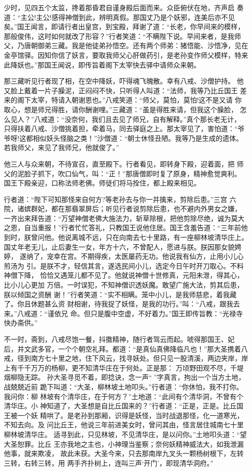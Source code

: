 少时，见四五个太监，搀着那昏君自谨身殿后面而来。众臣俯伏在地，齐声启
奏道：“主公!主公!感得神僧到此，辨明真假。那国丈乃是个妖邪，连美后亦不见
矣。”国王闻言，即请行者出皇宫，到宝殿，拜谢了道：“长老，你早间来的模样，
那般俊伟，这时如何就改了形容？”行者笑道：“不瞒陛下说。早间来者，是我师
父，乃唐朝御弟三藏。我是他徒弟孙悟空。还有两个师弟：猪悟能、沙悟净，见在
金亭馆驿。因知你信了妖言，要取我师父心肝做药引，是老孙变作师父模样，特来
此降妖也。”那国王闻说，即传旨着阁下太宰快去驿中请师众来朝。

那三藏听见行者现了相，在空中降妖，吓得魂飞魄散。幸有八戒、沙僧护持。
他又脸上戴着一片子臊泥，正闷闷不快，只听得人叫道：“法师，我等乃比丘国王
差来的阁下太宰，特请入朝谢恩也。”八戒笑道：“师父，莫怕，莫怕!这不是又请
你取心，想是师兄得胜，请你酬谢哩。”三藏道：“虽是得胜来请，但我这个臊脸，
怎么见人？”八戒道：“没奈何，我们且去见了师兄，自有解释。”真个那长老无计，
只得扶着八戒、沙僧挑着担，牵着马，同去驿庭之上。那太宰见了，害怕道：“爷
爷呀!这都相似妖头怪脑之类！”沙僧道：“朝士休怪丑陋。我等乃是生成的遗体。
若我师父，来见了我师兄，他就俊了。”

他三人与众来朝，不待宣召，直至殿下。行者看见，即转身下殿，迎着面，把
师父的泥脸子抓下，吹口仙气，叫：“正！”那唐僧即时复了原身，精神愈觉爽利。
国王下殿亲迎，口称法师老佛。师徒们将马拴住，都上殿来相见。

行者道：“陛下可知那怪来自何方?等老孙去与你一并擒来，剪除后患。”三宫
六院，诸嫔群妃，都在那翡翠屏后；听见行者说剪除后患，也不避内外男女之嫌，
一齐出来拜告道：“万望神僧老佛大施法力，斩草除根，把他剪除尽绝，诚为莫大
之恩，自当重报！”行者忙忙答礼，只教国王说他住居。国王含羞告道：“三年前他
到时，朕曾问他。他说离城不远，只在向南去七十里路，有一座柳林坡清华庄上。
国丈年老无儿，止后妻生一女，年方十六，不曾配人，愿进与朕。朕因那女貌娉婷，
遂纳了，宠幸在宫。不期得疾，太医屡药无功。他说我有仙方，止用小儿心煎汤为
引。是朕不才，轻信其言，遂选民间小儿，选定今日午时开刀取心。不料神僧下降，
恰恰又遇笼儿都不见了。他就说神僧十世修真，元阳未泄，得其心，比小儿心更加
万倍。一时误犯，不知神僧识透妖魔。敢望广施大法，剪其后患，朕以倾国之资酬
谢！”行者笑道：“实不相瞒。笼中小儿，是我师慈悲，着我藏了。你且休题甚么资
财相谢，待我捉了妖怪，是我的功行。”叫：“八戒，跟我去来。”八戒道：“谨依兄
命。但只是腹中空虚，不好着力。”国王即传旨教：“光禄寺快办斋供。”

不一时，斋到，八戒尽饱一餐，抖擞精神，随行者驾云而起。唬得那国王、妃
后，并文武多官，一个个朝空礼拜。都道：“是真仙真佛降临凡也！”那大圣携着八
戒，径到南方七十里之地，住下风云，找寻妖处。但只见一股清溪，两边夹岸，岸
上有千千万万的杨柳，更不知清华庄在于何处。正是那：
万顷野田观不尽，千堤烟柳隐无踪。
孙大圣寻觅不着，即捻诀，念一声“”字真言，拘出一个当方土地，战兢兢近前
跪下叫道：“大圣，柳林坡土地叩头。”行者道：“你休怕，我不打你。我问你：柳
林坡有个清华庄，在于何方？”土地道：“此间有个清华洞，不曾有个清华庄。小
神知道了，大圣想是自比丘国来的？”行者道：“正是，正是。比丘国王被一个妖
精哄了。是老孙到那厢，识得是妖怪，当时战退那怪，化一道寒光，不知去向。及
问比丘王，他说三年前进美女时，曾问其由，怪言居住城南七十里柳林坡清华庄。
适寻到此，只见林坡，不见清华庄，是以问你。”土地叩头道：“望大圣恕罪。比丘
王亦我地之主也，小神理当鉴察；奈何妖精神威法大，如我泄漏他事，就来欺凌，
故此未获。大圣今来，只去那南岸九叉头一颗杨树根下，左转三转，右转三转，用
两手齐扑树上，连叫三声‘开门’，即现清华洞府。”


